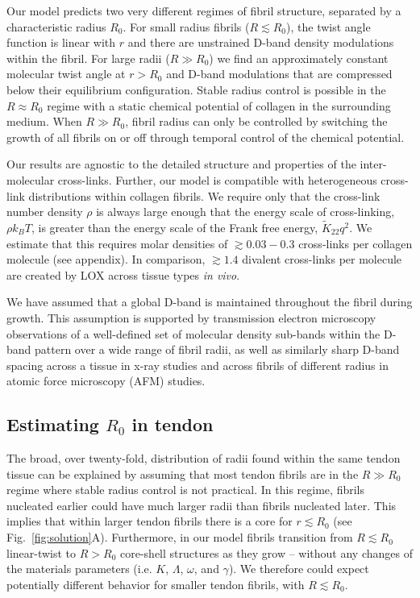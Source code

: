 \documentclass[twoside,twocolumn,9pt]{article}
\begin{document}
Our model predicts two very different regimes of fibril structure, separated by a characteristic radius $R_0$. For small radius fibrils ($R \lesssim R_0$), the twist angle function is linear with $r$ and there are unstrained D-band density modulations within the fibril. For large radii ($R \gg R_0$) we find an approximately constant molecular twist angle at $r > R_0$ and D-band modulations that are compressed below their equilibrium configuration. Stable radius control is possible in the $R \approx R_0$ regime with a static chemical potential of collagen in the surrounding medium. When $R \gg R_0$, fibril radius can only be controlled by switching the growth of all fibrils on or off through temporal control of the chemical potential.

Our results are  agnostic to the detailed structure and properties of the inter-molecular cross-links. Further, our model is compatible with heterogeneous cross-link distributions within collagen fibrils. We require only that the cross-link number density $\rho$ is  always large enough that the energy scale of cross-linking, $\rho k_BT$,\cite{Warner:1996} is  greater than the energy scale of the Frank free energy, $\tilde{K}_{22}q^2$. We estimate that this requires molar densities of $ \gtrsim 0.03-0.3$ cross-links per collagen molecule (see appendix).  In comparison, $\gtrsim 1.4$ divalent cross-links per molecule are created by LOX across tissue types \emph{in vivo}.\cite{Saito:1997, Depalle:2015}  

We have assumed that a global D-band is maintained throughout the fibril during growth. This assumption is supported by transmission electron microscopy observations of a well-defined set of molecular density sub-bands within the D-band pattern over a wide range of fibril radii,\cite{Hodge:1989, Quan:2015} as well as similarly sharp D-band spacing across a tissue in x-ray studies\cite{Berenguer:2014} and across fibrils of different radius in atomic force microscopy (AFM) studies.\cite{Baldwin:2020} 

\subsection{Estimating $R_0$ in tendon}
The broad, over twenty-fold,\cite{Kalson:2015, Goh:2012, PattersonKane:1997, Parry:1978} distribution of radii found within the same tendon tissue can be explained by assuming that most tendon fibrils are in the $R \gg R_0$ regime where stable radius control is not practical.\cite{equilibrium} In this regime, fibrils nucleated earlier could have much larger radii than fibrils nucleated later. This implies that within larger tendon fibrils there is a core for $r \lesssim R_0$ (see Fig.~\ref{fig:solution}A). Furthermore, in our model fibrils transition from $R \lesssim R_0$ linear-twist to $R > R_0$ core-shell structures as they grow -- without any changes of the materials parameters (i.e. $K$, $\Lambda$, $\omega$, and $\gamma$). We therefore could expect potentially different behavior for smaller tendon fibrils, with $R \lesssim R_0$. 
\end{document}
